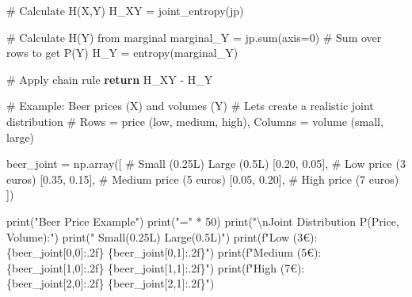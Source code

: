\documentclass[
  11pt,
  letterpaper,
  oneside,
  openany]{book}
\newenvironment{Shaded}{\begin{snugshade}}{\end{snugshade}}
\newcommand{\BuiltInTok}[1]{\textcolor[rgb]{0.00,0.23,0.31}{#1}}
\newcommand{\CharTok}[1]{\textcolor[rgb]{0.13,0.47,0.30}{#1}}
\newcommand{\CommentTok}[1]{\textcolor[rgb]{0.37,0.37,0.37}{#1}}
\newcommand{\ControlFlowTok}[1]{\textcolor[rgb]{0.00,0.23,0.31}{\textbf{#1}}}
\newcommand{\DecValTok}[1]{\textcolor[rgb]{0.68,0.00,0.00}{#1}}
\newcommand{\FloatTok}[1]{\textcolor[rgb]{0.68,0.00,0.00}{#1}}
\newcommand{\NormalTok}[1]{\textcolor[rgb]{0.00,0.23,0.31}{#1}}
\newcommand{\OperatorTok}[1]{\textcolor[rgb]{0.37,0.37,0.37}{#1}}
\newcommand{\SpecialCharTok}[1]{\textcolor[rgb]{0.37,0.37,0.37}{#1}}
\newcommand{\SpecialStringTok}[1]{\textcolor[rgb]{0.13,0.47,0.30}{#1}}
\newcommand{\StringTok}[1]{\textcolor[rgb]{0.13,0.47,0.30}{#1}}
\begin{document}
\begin{Shaded}
\begin{Highlighting}[]
    \CommentTok{\# Calculate H(X,Y)}
\NormalTok{    H\_XY }\OperatorTok{=}\NormalTok{ joint\_entropy(jp)}
    
    \CommentTok{\# Calculate H(Y) from marginal}
\NormalTok{    marginal\_Y }\OperatorTok{=}\NormalTok{ jp.}\BuiltInTok{sum}\NormalTok{(axis}\OperatorTok{=}\DecValTok{0}\NormalTok{)  }\CommentTok{\# Sum over rows to get P(Y)}
\NormalTok{    H\_Y }\OperatorTok{=}\NormalTok{ entropy(marginal\_Y)}
    
    \CommentTok{\# Apply chain rule}
    \ControlFlowTok{return}\NormalTok{ H\_XY }\OperatorTok{{-}}\NormalTok{ H\_Y}


\CommentTok{\# Example: Beer prices (X) and volumes (Y)}
\CommentTok{\# Let\textquotesingle{}s create a realistic joint distribution}
\CommentTok{\# Rows = price (low, medium, high), Columns = volume (small, large)}

\NormalTok{beer\_joint }\OperatorTok{=}\NormalTok{ np.array([}
    \CommentTok{\# Small (0.25L)  Large (0.5L)}
\NormalTok{    [}\FloatTok{0.20}\NormalTok{,          }\FloatTok{0.05}\NormalTok{],  }\CommentTok{\# Low price (3 euros)}
\NormalTok{    [}\FloatTok{0.35}\NormalTok{,          }\FloatTok{0.15}\NormalTok{],  }\CommentTok{\# Medium price (5 euros)  }
\NormalTok{    [}\FloatTok{0.05}\NormalTok{,          }\FloatTok{0.20}\NormalTok{],  }\CommentTok{\# High price (7 euros)}
\NormalTok{])}

\BuiltInTok{print}\NormalTok{(}\StringTok{"Beer Price Example"}\NormalTok{)}
\BuiltInTok{print}\NormalTok{(}\StringTok{"="} \OperatorTok{*} \DecValTok{50}\NormalTok{)}
\BuiltInTok{print}\NormalTok{(}\StringTok{"}\CharTok{\textbackslash{}n}\StringTok{Joint Distribution P(Price, Volume):"}\NormalTok{)}
\BuiltInTok{print}\NormalTok{(}\StringTok{"                Small(0.25L)  Large(0.5L)"}\NormalTok{)}
\BuiltInTok{print}\NormalTok{(}\SpecialStringTok{f"Low (3€):       }\SpecialCharTok{\{}\NormalTok{beer\_joint[}\DecValTok{0}\NormalTok{,}\DecValTok{0}\NormalTok{]}\SpecialCharTok{:.2f\}}\SpecialStringTok{         }\SpecialCharTok{\{}\NormalTok{beer\_joint[}\DecValTok{0}\NormalTok{,}\DecValTok{1}\NormalTok{]}\SpecialCharTok{:.2f\}}\SpecialStringTok{"}\NormalTok{)}
\BuiltInTok{print}\NormalTok{(}\SpecialStringTok{f"Medium (5€):    }\SpecialCharTok{\{}\NormalTok{beer\_joint[}\DecValTok{1}\NormalTok{,}\DecValTok{0}\NormalTok{]}\SpecialCharTok{:.2f\}}\SpecialStringTok{         }\SpecialCharTok{\{}\NormalTok{beer\_joint[}\DecValTok{1}\NormalTok{,}\DecValTok{1}\NormalTok{]}\SpecialCharTok{:.2f\}}\SpecialStringTok{"}\NormalTok{)}
\BuiltInTok{print}\NormalTok{(}\SpecialStringTok{f"High (7€):      }\SpecialCharTok{\{}\NormalTok{beer\_joint[}\DecValTok{2}\NormalTok{,}\DecValTok{0}\NormalTok{]}\SpecialCharTok{:.2f\}}\SpecialStringTok{         }\SpecialCharTok{\{}\NormalTok{beer\_joint[}\DecValTok{2}\NormalTok{,}\DecValTok{1}\NormalTok{]}\SpecialCharTok{:.2f\}}\SpecialStringTok{"}\NormalTok{)}


\end{Highlighting}
\end{Shaded}
\end{document}
